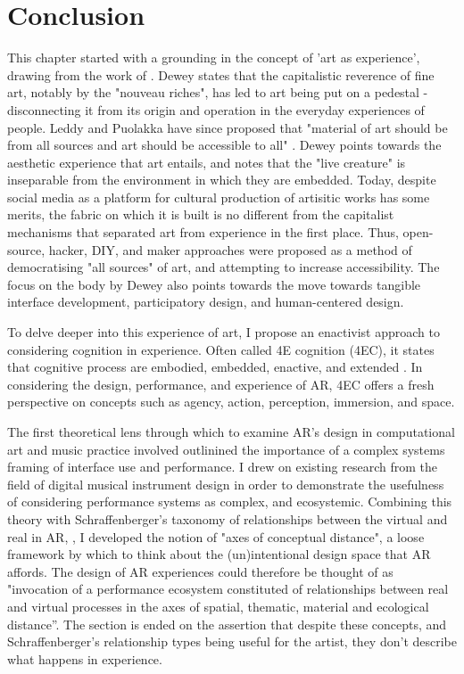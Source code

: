\section{Conclusion}
This chapter started with a grounding in the concept of 'art as experience', drawing from the work of \citep{dewey1934}. Dewey states that the capitalistic reverence of fine art, notably by the "nouveau riches", has led to art being put on a pedestal - disconnecting it from its origin and operation in the everyday experiences of people. Leddy and Puolakka have since proposed that "material of art should be from all sources and art should be accessible to all" \citeyearpar{leddy2021}. Dewey points towards the aesthetic experience that art entails, and notes that the "live creature" is inseparable from the environment in which they are embedded. Today, despite social media as a platform for cultural production of artisitic works has some merits, the fabric on which it is built is no different from the capitalist mechanisms that separated art from experience in the first place. Thus, open-source, hacker, DIY, and maker approaches were proposed as a method of democratising "all sources" of art, and attempting to increase accessibility. The focus on the body by Dewey also points towards the move towards tangible interface development, participatory design, and human-centered design.

To delve deeper into this experience of art, I propose an enactivist approach to considering cognition in experience. Often called 4E cognition (4EC), it states that cognitive process are embodied, embedded, enactive, and extended \citep{gallagher2017}. In considering the design, performance, and experience of AR, 4EC offers a fresh perspective on concepts such as agency, action, perception, immersion, and space.

The first theoretical lens through which to examine AR's design in computational art and music practice involved outlinined the importance of a complex systems framing of interface use and performance. I drew on existing research from the field of digital musical instrument design \citep{magnusson2009a,discipio2003,essl2006,armstrong2006,hayes2019,chevalier2018} in order to demonstrate the usefulness of considering performance systems as complex, and ecosystemic. Combining this theory with Schraffenberger's taxonomy of relationships between the virtual and real in AR, \citeyearpar{schraffenberger2018}, I developed the notion of "axes of conceptual distance", a loose framework by which to think about the (un)intentional design space that AR affords. The design of AR experiences could therefore be thought of as "invocation of a performance ecosystem constituted of relationships between real and virtual processes in the axes of spatial, thematic, material and ecological distance”. The section is ended on the assertion that despite these concepts, and Schraffenberger's relationship types being useful for the artist, they don't describe what happens in experience.

